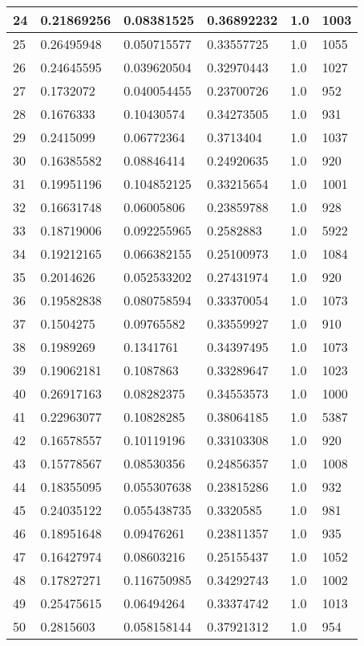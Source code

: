 \begin{longtable}{|l|l|l|l|l|l|}
24 & 0.21869256 & 0.08381525 & 0.36892232 & 1.0 & 1003 \\ \hline 
25 & 0.26495948 & 0.050715577 & 0.33557725 & 1.0 & 1055 \\ \hline 
26 & 0.24645595 & 0.039620504 & 0.32970443 & 1.0 & 1027 \\ \hline 
27 & 0.1732072 & 0.040054455 & 0.23700726 & 1.0 & 952 \\ \hline 
28 & 0.1676333 & 0.10430574 & 0.34273505 & 1.0 & 931 \\ \hline 
29 & 0.2415099 & 0.06772364 & 0.3713404 & 1.0 & 1037 \\ \hline 
30 & 0.16385582 & 0.08846414 & 0.24920635 & 1.0 & 920 \\ \hline 
31 & 0.19951196 & 0.104852125 & 0.33215654 & 1.0 & 1001 \\ \hline 
32 & 0.16631748 & 0.06005806 & 0.23859788 & 1.0 & 928 \\ \hline 
33 & 0.18719006 & 0.092255965 & 0.2582883 & 1.0 & 5922 \\ \hline 
34 & 0.19212165 & 0.066382155 & 0.25100973 & 1.0 & 1084 \\ \hline 
35 & 0.2014626 & 0.052533202 & 0.27431974 & 1.0 & 920 \\ \hline 
36 & 0.19582838 & 0.080758594 & 0.33370054 & 1.0 & 1073 \\ \hline 
37 & 0.1504275 & 0.09765582 & 0.33559927 & 1.0 & 910 \\ \hline 
38 & 0.1989269 & 0.1341761 & 0.34397495 & 1.0 & 1073 \\ \hline 
39 & 0.19062181 & 0.1087863 & 0.33289647 & 1.0 & 1023 \\ \hline 
40 & 0.26917163 & 0.08282375 & 0.34553573 & 1.0 & 1000 \\ \hline 
41 & 0.22963077 & 0.10828285 & 0.38064185 & 1.0 & 5387 \\ \hline 
42 & 0.16578557 & 0.10119196 & 0.33103308 & 1.0 & 920 \\ \hline 
43 & 0.15778567 & 0.08530356 & 0.24856357 & 1.0 & 1008 \\ \hline 
44 & 0.18355095 & 0.055307638 & 0.23815286 & 1.0 & 932 \\ \hline 
45 & 0.24035122 & 0.055438735 & 0.3320585 & 1.0 & 981 \\ \hline 
46 & 0.18951648 & 0.09476261 & 0.23811357 & 1.0 & 935 \\ \hline 
47 & 0.16427974 & 0.08603216 & 0.25155437 & 1.0 & 1052 \\ \hline 
48 & 0.17827271 & 0.116750985 & 0.34292743 & 1.0 & 1002 \\ \hline 
49 & 0.25475615 & 0.06494264 & 0.33374742 & 1.0 & 1013 \\ \hline 
50 & 0.2815603 & 0.058158144 & 0.37921312 & 1.0 & 954 \\ \hline 
\end{longtable}